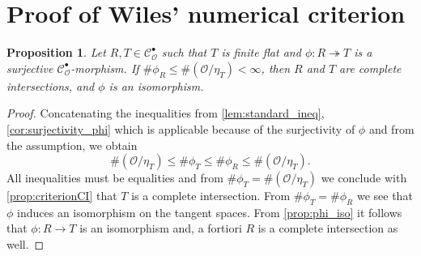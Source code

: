 \documentclass{article}
\theoremstyle{plain}%
\newtheorem{proposition}{Proposition}[section]
\theoremstyle{definition}
\theoremstyle{remark}
\newcommand{\cob}{\mathcal{C}_\mathcal{O}^\bullet}
\begin{document}
\section{Proof of Wiles' numerical criterion}

\begin{proposition}
    Let \(R, T \in \cob\) such that \(T\) is finite flat and 
    \(\phi\colon R \twoheadrightarrow T\) is a surjective \(\cob\)-morphism.
    If \(\# \phi_R \leq \#(\mathcal{O}/\eta_T) < \infty\), then \(R\) and \(T\) are complete intersections,
    and \(\phi\) is an isomorphism.
\end{proposition}
\begin{proof}
    Concatenating the inequalities from \cref{lem:standard_ineq}, 
    \cref{cor:surjectivity_phi} which is applicable because of the surjectivity of \(\phi\)
    and from the assumption, we obtain
    \[
        \#(\mathcal{O}/\eta_T) \leq \#\phi_T \leq \#\phi_R \leq \#(\mathcal{O}/\eta_T).
    \]
    All inequalities must be equalities and from \(\#\phi_T = \#(\mathcal{O}/\eta_T)\)
    we conclude with \cref{prop:criterionCI} that \(T\) is a complete intersection.
    From \(\#\phi_T = \#\phi_R \) we see that \(\phi\) induces an isomorphism on the tangent spaces.
    From \cref{prop:phi_iso} it follows that \(\phi\colon R \to T\) is an isomorphism and, 
    a fortiori \(R\) is a complete intersection as well.
\end{proof}

\newpage
\printbibliography
\end{document}
